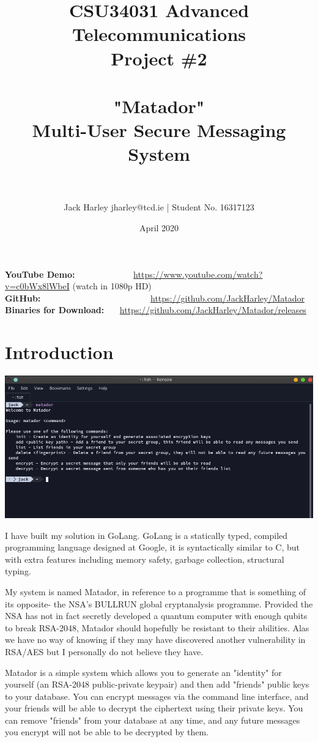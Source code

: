 \documentclass{article}[12pt]
\title{CSU34031 Advanced Telecommunications\\Project \#2\\~\\"Matador"\\Multi-User Secure Messaging System\\~}
\author{Jack Harley jharley@tcd.ie | Student No. 16317123}
\date{April 2020}
\begin{document}
	\maketitle
	
	\textbf{YouTube Demo:} ~~~~~~~~~~~~~\url{https://www.youtube.com/watch?v=c0bWx8lWbeI} (watch in 1080p HD)\\
	\textbf{GitHub:} ~~~~~~~~~~~~~~~~~~~~~~~~~\url{https://github.com/JackHarley/Matador}\\
	\textbf{Binaries for Download:} ~~~\url{https://github.com/JackHarley/Matador/releases}
	
	\tableofcontents
	
	\newpage
	
	\setlength{\parskip}{1em}
		
	\section{Introduction}
	
		\includegraphics[width=18cm]{intro.png}
		
		I have built my solution in GoLang. GoLang is a statically typed, compiled programming language designed at Google, it is syntactically similar to C, but with extra features including memory safety, garbage collection, structural typing.
		
		My system is named Matador, in reference to a programme that is something of its opposite- the NSA's BULLRUN global cryptanalysis programme. Provided the NSA has not in fact secretly developed a quantum computer with enough qubits to break RSA-2048, Matador should hopefully be resistant to their abilities. Alas we have no way of knowing if they may have discovered another vulnerability in RSA/AES but I personally do not believe they have.
		
		Matador is a simple system which allows you to generate an "identity" for yourself (an RSA-2048 public-private keypair) and then add "friends" public keys to your database. You can encrypt messages via the command line interface, and your friends will be able to decrypt the ciphertext using their private keys. You can remove "friends" from your database at any time, and any future messages you encrypt will not be able to be decrypted by them.
		
\end{document}
